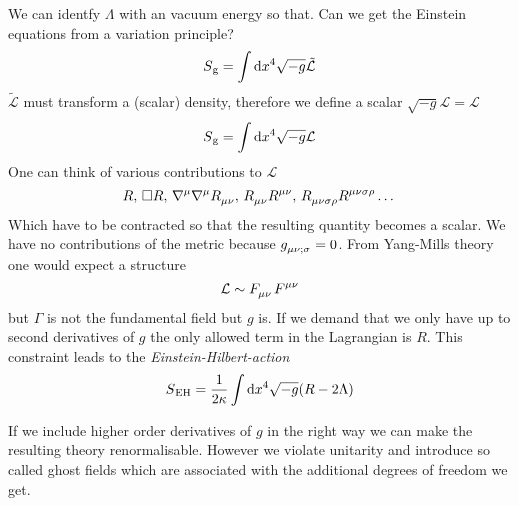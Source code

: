 We can identfy $\Lambda$ with an vacuum energy so that. Can we get the Einstein
equations from a variation principle?
\begin{equation}
S\textsubscript{g}=\int\dif x^4 \sqrt{-g}\tilde{\mathcal{L}}
\end{equation}
$\tilde{\mathcal{L}}$ must transform a (scalar) density, therefore we define a
scalar $\sqrt{-g}\mathcal{L}=\mathcal{L}$
\begin{equation}
S\textsubscript{g}=\int\dif x^4 \sqrt{-g}\mathcal{L}
\end{equation}
One can think of various contributions to $\mathcal{L}$
\begin{equation*}
R,\, \square
R,\,\tensor{\nabla}{^\mu}\tensor{\nabla}{^\mu}\tensor{R}{_\mu_\nu},\,
\tensor{R}{_\mu_\nu}\tensor{R}{^\mu^\nu}
,\,\tensor{R}{_\mu_\nu_\sigma_\rho}\tensor{R}{^\mu^\nu^\sigma^\rho}\dots
\end{equation*}
Which have to be contracted so that the resulting quantity becomes a scalar.
We have no contributions of the metric because
$\tensor{g}{_\mu_\nu_{;\sigma}}=0$. From Yang-Mills theory one would expect a
structure 
\begin{equation}
\mathcal{L}\sim\tensor{F}{_\mu_\nu}\tensor{F}{^\mu^\nu}
\end{equation}
but $\Gamma$ is not the fundamental field but $g$ is. If we demand that we only
have up to second derivatives of $g$ the only allowed term in the Lagrangian is
$R$.
This constraint leads to the \emph{Einstein-Hilbert-action}
\begin{equation}
S\textsubscript{EH}=\frac{1}{2\kappa}\int\dif x^4 \sqrt{-g}(R-2\Lambda)
\end{equation}
\begin{sidenote}
If we include higher order derivatives of $g$ in the right way we can make the
resulting theory renormalisable. However we violate unitarity and introduce so
called ghost fields which are associated with the additional degrees of freedom
we get.
\end{sidenote}
 